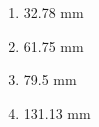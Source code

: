 \documentclass[journal,12pt,onecolumn]{article}
\theoremstyle{remark}
\begin{document}
\begin{enumerate}
    \begin{multicols}{2}
    \begin{enumerate}
        \item 32.78 mm 
        \item 61.75 mm 
        \item 79.5 mm 
        \item 131.13 mm
    \end{enumerate}
\end{multicols}
\end{enumerate}
\end{document}
